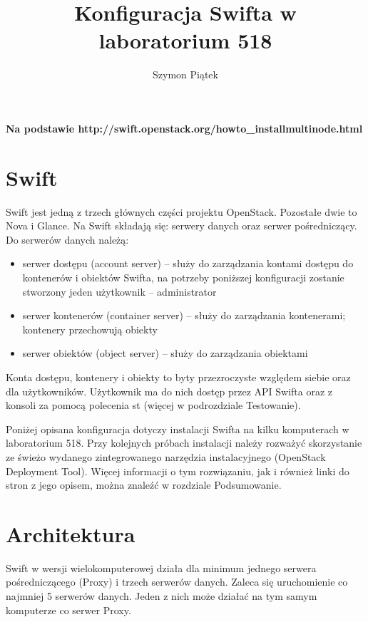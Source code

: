 \documentclass[12pt]{article}
\title{Konfiguracja Swifta w laboratorium 518}
\author{Szymon Piątek}
\begin{document}
\maketitle
\begin{center}
\textbf{Na podstawie http://swift.openstack.org/howto\_installmultinode.html}
\end{center}

\section{Swift}

Swift jest jedną z trzech głównych części projektu OpenStack. Pozostałe dwie to Nova i Glance. Na Swift składają się: serwery danych oraz serwer pośredniczący. Do serwerów danych należą: 

\begin{itemize}
\item serwer dostępu (account server) – służy do zarządzania kontami dostępu do kontenerów i obiektów Swifta, na potrzeby poniższej konfiguracji zostanie stworzony jeden użytkownik – administrator
\item serwer kontenerów (container server) – służy do zarządzania kontenerami; kontenery przechowują obiekty
\item serwer obiektów (object server) – służy do zarządzania obiektami
\end{itemize}

Konta dostępu, kontenery i obiekty to byty przezroczyste względem siebie oraz dla użytkowników. Użytkownik ma do nich dostęp przez API Swifta oraz z konsoli za pomocą polecenia st (więcej w podrozdziale Testowanie).

Poniżej opisana konfiguracja dotyczy instalacji Swifta na kilku komputerach w laboratorium 518. Przy kolejnych próbach instalacji należy rozważyć skorzystanie ze świeżo wydanego zintegrowanego narzędzia instalacyjnego (OpenStack Deployment Tool). Więcej informacji o tym rozwiązaniu, jak i również linki do stron z jego opisem, można znaleźć w rozdziale Podsumowanie.

\section{Architektura}
Swift w wersji wielokomputerowej działa dla minimum jednego serwera pośredniczącego (Proxy) i trzech serwerów danych. Zaleca się uruchomienie co najmniej 5 serwerów danych. Jeden z nich może działać na tym samym komputerze co serwer Proxy.
\end{document}
